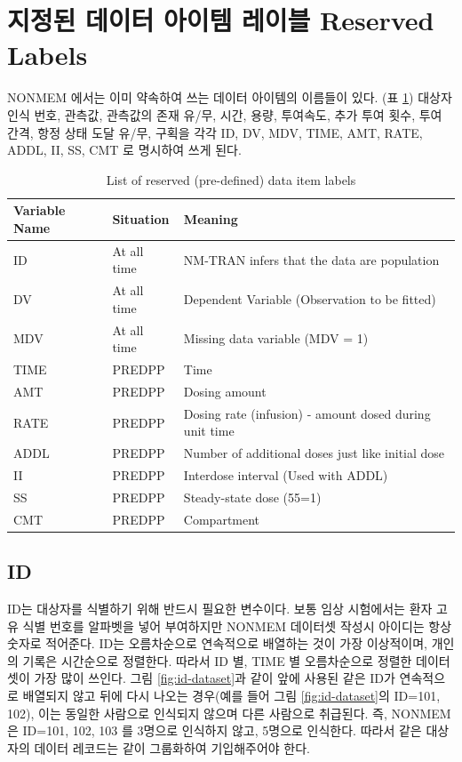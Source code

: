 \documentclass[
  10pt,
  krantz2,
  a4paper]{krantz}
\theoremstyle{definition}
\theoremstyle{definition}
\theoremstyle{definition}
\theoremstyle{remark}
\begin{document}
\hypertarget{uxc9c0uxc815uxb41c-uxb370uxc774uxd130-uxc544uxc774uxd15c-uxb808uxc774uxbe14-reserved-labels}{%
\section{지정된 데이터 아이템 레이블 Reserved Labels}\label{uxc9c0uxc815uxb41c-uxb370uxc774uxd130-uxc544uxc774uxd15c-uxb808uxc774uxbe14-reserved-labels}}

NONMEM 에서는 이미 약속하여 쓰는 데이터 아이템의 이름들이 있다. (표 \ref{tab:reserveditems}) 대상자 인식 번호, 관측값, 관측값의 존재 유/무, 시간, 용량, 투여속도, 추가 투여 횟수, 투여 간격, 항정 상태 도달 유/무, 구획을 각각 ID, DV, MDV, TIME, AMT, RATE, ADDL, II, SS, CMT 로 명시하여 쓰게 된다.

\begin{table}

\caption{\label{tab:reserveditems}List of reserved (pre-defined) data item labels}
\centering
\begin{tabular}[t]{lll}
\toprule
Variable Name & Situation & Meaning\\
\midrule
ID & At all time & NM-TRAN infers that the data are population\\
DV & At all time & Dependent Variable (Observation to be fitted)\\
MDV & At all time & Missing data variable (MDV = 1)\\
TIME & PREDPP & Time\\
AMT & PREDPP & Dosing amount\\
\addlinespace
RATE & PREDPP & Dosing rate (infusion) - amount dosed during unit time\\
ADDL & PREDPP & Number of additional doses just like initial dose\\
II & PREDPP & Interdose interval (Used with ADDL)\\
SS & PREDPP & Steady-state dose (55=1)\\
CMT & PREDPP & Compartment\\
\bottomrule
\end{tabular}
\end{table}

\hypertarget{id}{%
\subsection{ID}\label{id}}

ID는 대상자를 식별하기 위해 반드시 필요한 변수이다. 보통 임상 시험에서는 환자 고유 식별 번호를 알파벳을 넣어 부여하지만 NONMEM 데이터셋 작성시 아이디는 항상 숫자로 적어준다. ID는 오름차순으로 연속적으로 배열하는 것이 가장 이상적이며, 개인의 기록은 시간순으로 정렬한다. 따라서 ID 별, TIME 별 오름차순으로 정렬한 데이터 셋이 가장 많이 쓰인다. 그림 \ref{fig:id-dataset}과 같이 앞에 사용된 같은 ID가 연속적으로 배열되지 않고 뒤에 다시 나오는 경우(예를 들어 그림 \ref{fig:id-dataset}의 ID=101, 102), 이는 동일한 사람으로 인식되지 않으며 다른 사람으로 취급된다. 즉, NONMEM 은 ID=101, 102, 103 를 3명으로 인식하지 않고, 5명으로 인식한다. 따라서 같은 대상자의 데이터 레코드는 같이 그룹화하여 기입해주어야 한다.
\end{document}
